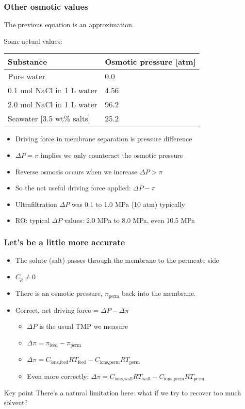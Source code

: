 \begin{frame}\frametitle{Other osmotic values}
	The previous equation is an approximation.

	\vspace{12pt}
	Some actual values:
	\begin{tabular}{ll}\\ \hline
	 	\textbf{Substance}  		& \textbf{Osmotic pressure [atm]} \\ \hline
		Pure water					& 0.0\\
		0.1 mol NaCl in 1 L water 	& 4.56\\
		2.0 mol NaCl in 1 L water	& 96.2\\
		Seawater [3.5 wt\% salts]	& 25.2\\
	\end{tabular}

	\begin{itemize}
		\item	Driving force in membrane separation is pressure difference
		\item	$\Delta P = \pi$ implies we only counteract the osmotic pressure
		\item	Reverse osmosis occurs when we increase $\Delta P > \pi$
		\item	So the net useful driving force applied: $\Delta P - \pi$
		\item	Ultrafiltration $\Delta P$ was 0.1 to 1.0 MPa (10 atm) typically
		\item	RO: typical $\Delta P$ values: 2.0 MPa to 8.0 MPa, even 10.5 MPa  %
	\end{itemize}
\end{frame}

\begin{frame}\frametitle{Let's be a little more accurate}
	\begin{itemize}
		\item	The solute (salt) passes through the membrane to the permeate side
		\item	$C_p \neq 0$
		\item	There is an osmotic pressure, $\pi_\text{perm}$ back into the membrane.
		\item	Correct, net driving force = $\Delta P - \Delta \pi$
		\begin{itemize}
			\item	$\Delta P$ is the usual TMP we measure
			\item	$\Delta \pi = \pi_\text{feed} - \pi_\text{perm}$
			\item	$\Delta \pi = C_\text{ions,feed}RT_\text{feed} - C_\text{ions,perm}RT_\text{perm}$
			\item	Even more correctly: $\Delta \pi = C_\text{ions,wall}RT_\text{wall} - C_\text{ions,perm}RT_\text{perm}$
		\end{itemize}
	\end{itemize}
	
	\vspace{12pt}
	\begin{exampleblock}{Key point}
		There's a natural limitation here: what if we try to recover too much solvent?
	\end{exampleblock}	
\end{frame}

